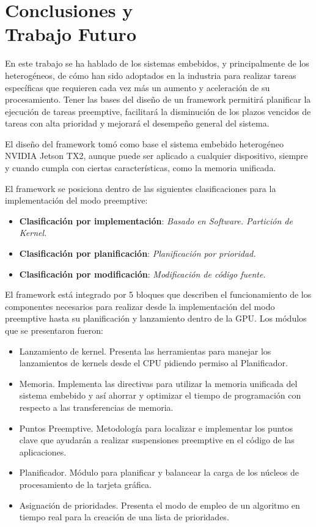 \chapter{Conclusiones y\\ Trabajo Futuro}
    \label{cha:Conclusiones}
    
En este trabajo se ha hablado de los sistemas embebidos, y principalmente de los heterogéneos, de cómo han sido adoptados en la industria para realizar tareas específicas que requieren cada vez más un aumento y aceleración de su procesamiento.
Tener las bases del diseño de un framework permitirá planificar la ejecución de tareas preemptive, facilitará la disminución de los plazos vencidos de tareas con alta prioridad y mejorará el desempeño general del sistema.
\newline

El diseño del framework tomó como base el sistema embebido heterogéneo NVIDIA Jetson TX2, aunque puede ser aplicado a cualquier dispositivo, siempre y cuando cumpla con ciertas características, como la memoria unificada.
\newline

El framework se posiciona dentro de las siguientes clasificaciones para la implementación del modo preemptive:

\begin{itemize}
    \item \textbf{Clasificación por implementación}: \textit{Basado en Software. Partición de Kernel.}
    \item \textbf{Clasificación por planificación}: \textit{Planificación por prioridad.}
    \item \textbf{Clasificación por modificación}: \textit{Modificación de código fuente.}
\end{itemize}
    
El framework está integrado por 5 bloques que describen el funcionamiento de los componentes necesarios para realizar desde la implementación del modo preemptive hasta su planificación y lanzamiento dentro de la GPU. 
Los módulos que se presentaron fueron:

\begin{itemize}
\item Lanzamiento de kernel. Presenta las herramientas para manejar los lanzamientos de kernels desde el CPU pidiendo permiso al Planificador.
\item Memoria. Implementa las directivas para utilizar la memoria unificada del sistema embebido y así ahorrar y optimizar el tiempo de programación con respecto a las transferencias de memoria.
\item Puntos Preemptive. Metodología para localizar e implementar los puntos clave que ayudarán a realizar suspensiones preemptive en el código de las aplicaciones.
\item Planificador. Módulo para planificar y balancear la carga de los núcleos de procesamiento de la tarjeta gráfica. 
\item Asignación de prioridades. Presenta el modo de empleo de un algoritmo en tiempo real para la creación de una lista de prioridades.
\end{itemize}

